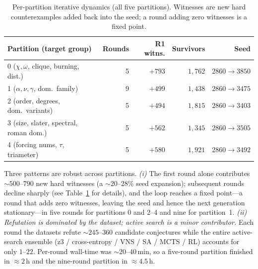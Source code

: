\documentclass[]{ceurart}
\begin{document}
\begin{table}
  \caption{Per-partition iterative dynamics (all five partitions). Witnesses are new
  hard counterexamples added back into the seed; a round adding zero witnesses
  is a fixed point.}
  \label{tab:rounds}
  \begin{tabular}{lrrrr}
    \toprule
    Partition (target group) & Rounds & R1 witns. & Survivors & Seed \\
    \midrule
    0 ($\chi,\omega$, clique, burning, dist.) & 5 & $+793$ & $1{,}762$ & $2860\!\to\!3850$\\
    1 ($\alpha,\nu,\gamma$, dom.\ family)   & 9 & $+499$ & $1{,}438$ & $2860\!\to\!3475$\\
    2 (order, degrees, dom.\ variants)      & 5 & $+494$ & $1{,}815$ & $2860\!\to\!3403$\\
    3 (size, slater, spectral, roman dom.)  & 5 & $+562$ & $1{,}345$ & $2860\!\to\!3505$\\
    4 (forcing nums, $\tau$, triameter)     & 5 & $+580$ & $1{,}921$ & $2860\!\to\!3492$\\
    \bottomrule
  \end{tabular}
\end{table}

Three patterns are robust across partitions. \emph{(i)} The first round alone contributes
$\sim\!500$--$790$ new hard witnesses (a $\sim\!20$--$28\%$ seed expansion); subsequent
rounds decline sharply (see Table~\ref{tab:rounds} for details),
and the loop reaches a fixed point---a round that adds zero witnesses, leaving
the seed and hence the next generation stationary---in five rounds for partitions
0 and 2--4 and nine for partition~1. \emph{(ii) Refutation is dominated by the
dataset; active search is
a minor contributor.} Each round the datasets refute $\sim\!245$--$360$
candidate conjectures while the entire active-search ensemble (z3 / cross-entropy / VNS / SA
/ MCTS / RL) accounts for only $1$--$22$. Per-round wall-time was
$\sim\!20$--$40$\,min, so a five-round partition finished in $\approx\!2$\,h and the
nine-round partition in $\approx\!4.5$\,h. 
\end{document}
